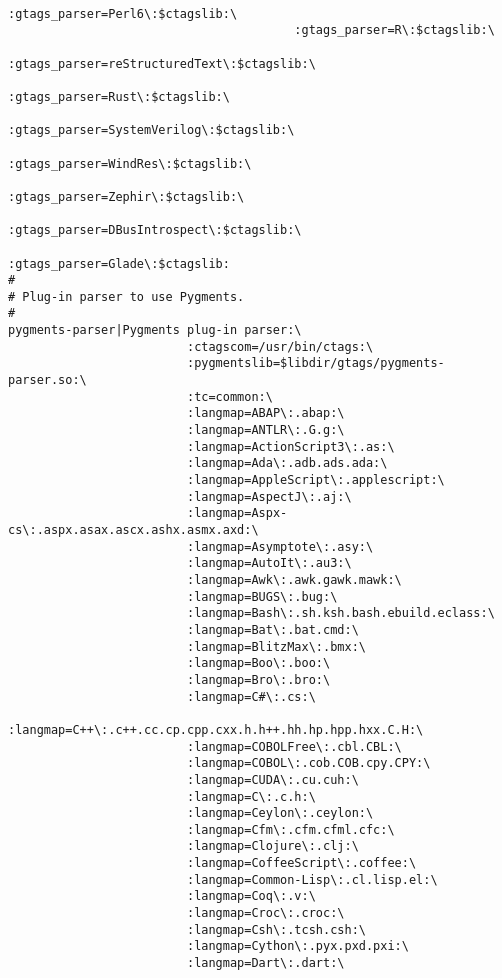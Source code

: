\documentclass[11pt]{article}
\begin{document}
\begin{lstlisting}
                                        :gtags_parser=Perl6\:$ctagslib:\
                                        :gtags_parser=R\:$ctagslib:\
                                        :gtags_parser=reStructuredText\:$ctagslib:\
                                        :gtags_parser=Rust\:$ctagslib:\
                                        :gtags_parser=SystemVerilog\:$ctagslib:\
                                        :gtags_parser=WindRes\:$ctagslib:\
                                        :gtags_parser=Zephir\:$ctagslib:\
                                        :gtags_parser=DBusIntrospect\:$ctagslib:\
                                        :gtags_parser=Glade\:$ctagslib:
#
# Plug-in parser to use Pygments.
#
pygments-parser|Pygments plug-in parser:\
                         :ctagscom=/usr/bin/ctags:\
                         :pygmentslib=$libdir/gtags/pygments-parser.so:\
                         :tc=common:\
                         :langmap=ABAP\:.abap:\
                         :langmap=ANTLR\:.G.g:\
                         :langmap=ActionScript3\:.as:\
                         :langmap=Ada\:.adb.ads.ada:\
                         :langmap=AppleScript\:.applescript:\
                         :langmap=AspectJ\:.aj:\
                         :langmap=Aspx-cs\:.aspx.asax.ascx.ashx.asmx.axd:\
                         :langmap=Asymptote\:.asy:\
                         :langmap=AutoIt\:.au3:\
                         :langmap=Awk\:.awk.gawk.mawk:\
                         :langmap=BUGS\:.bug:\
                         :langmap=Bash\:.sh.ksh.bash.ebuild.eclass:\
                         :langmap=Bat\:.bat.cmd:\
                         :langmap=BlitzMax\:.bmx:\
                         :langmap=Boo\:.boo:\
                         :langmap=Bro\:.bro:\
                         :langmap=C#\:.cs:\
                         :langmap=C++\:.c++.cc.cp.cpp.cxx.h.h++.hh.hp.hpp.hxx.C.H:\
                         :langmap=COBOLFree\:.cbl.CBL:\
                         :langmap=COBOL\:.cob.COB.cpy.CPY:\
                         :langmap=CUDA\:.cu.cuh:\
                         :langmap=C\:.c.h:\
                         :langmap=Ceylon\:.ceylon:\
                         :langmap=Cfm\:.cfm.cfml.cfc:\
                         :langmap=Clojure\:.clj:\
                         :langmap=CoffeeScript\:.coffee:\
                         :langmap=Common-Lisp\:.cl.lisp.el:\
                         :langmap=Coq\:.v:\
                         :langmap=Croc\:.croc:\
                         :langmap=Csh\:.tcsh.csh:\
                         :langmap=Cython\:.pyx.pxd.pxi:\
                         :langmap=Dart\:.dart:\

\end{lstlisting}
\end{document}
